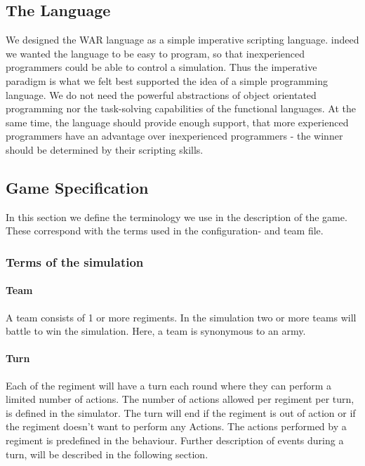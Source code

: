 	\subsection{The Language}
		We designed the WAR language as a simple imperative scripting language. 
		indeed we wanted the language to be easy to program, so that inexperienced programmers could be able to control a simulation. Thus the imperative paradigm is what we felt best supported the idea of a simple programming language. We do not need the
		powerful abstractions of object orientated programming nor the task-solving capabilities of the functional languages. At the same time, the language should provide enough support, that more experienced programmers have an advantage over inexperienced programmers - the winner should be determined by their scripting skills.
		
		 
	\subsection{Game Specification}
	In this section we define the terminology we use in the description of the game. \\
	These correspond with the terms used in the configuration- and team file.
	
		\subsubsection{Terms of the simulation}
		
		\paragraph{Team}		
		A team consists of 1 or more regiments. In the simulation two or more teams will battle to win the simulation. Here, a team is synonymous to an army.
		
		\paragraph{Turn}
		Each of the regiment will have a turn each round where they can perform a limited number of actions. The number of actions allowed per regiment per turn, is defined in the simulator.
		The turn will end if the regiment is out of action or if the regiment doesn't want to perform any Actions. 
		The actions performed by a regiment is predefined in the behaviour. 
		Further description of events during a turn, will be described in the following section.
		
